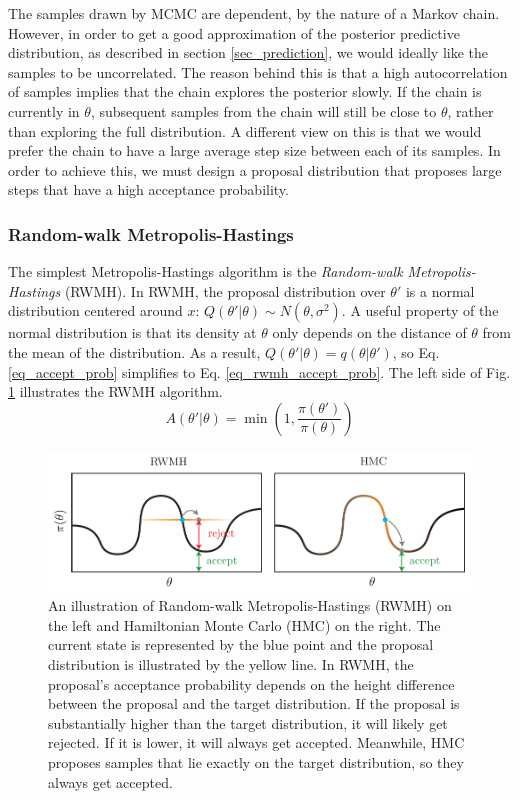 \documentclass[12pt]{article}
\begin{document}
The samples drawn by MCMC are dependent, by the nature of a Markov chain. However, in order to get a good approximation of the posterior predictive distribution, as described in section \ref{sec_prediction}, we would ideally like the samples to be uncorrelated. The reason behind this is that a high autocorrelation of samples implies that the chain explores the posterior slowly. If the chain is currently in $\theta$, subsequent samples from the chain will still be close to $\theta$, rather than exploring the full distribution. A different view on this is that we would prefer the chain to have a large average step size between each of its samples. In order to achieve this, we must design a proposal distribution that proposes large steps that have a high acceptance probability.

\subsubsection{Random-walk Metropolis-Hastings}

The simplest Metropolis-Hastings algorithm is the \textit{Random-walk Metropolis-Hastings} (RWMH). In RWMH, the proposal distribution over $\theta'$ is a normal distribution centered around $x$: $Q(\theta'|\theta) \sim N(\theta, \sigma^2)$. A useful property of the normal distribution is that its density at $\theta$ only depends on the distance of $\theta$ from the mean of the distribution. As a result, $Q(\theta'|\theta) = q(\theta|\theta')$, so Eq. \ref{eq_accept_prob} simplifies to Eq. \ref{eq_rwmh_accept_prob}. The left side of Fig. \ref{fig_rwmh_vs_hmc} illustrates the RWMH algorithm.
\begin{equation}
A(\theta'|\theta) = \min \left(1, \frac{\pi(\theta')}{\pi(\theta)} \right)
\label{eq_rwmh_accept_prob}
\end{equation}

\begin{figure}[H]
\centering
\includegraphics[width=14cm]{illustrations/rwmh_vs_hmc.pdf}
\caption{An illustration of Random-walk Metropolis-Hastings (RWMH) on the left and Hamiltonian Monte Carlo (HMC) on the right. The current state is represented by the blue point and the proposal distribution is illustrated by the yellow line. In RWMH, the proposal's acceptance probability depends on the height difference between the proposal and the target distribution. If the proposal is substantially higher than the target distribution, it will likely get rejected. If it is lower, it will always get accepted. Meanwhile, HMC proposes samples that lie exactly on the target distribution, so they always get accepted.}
\label{fig_rwmh_vs_hmc}
\end{figure}
\end{document}
